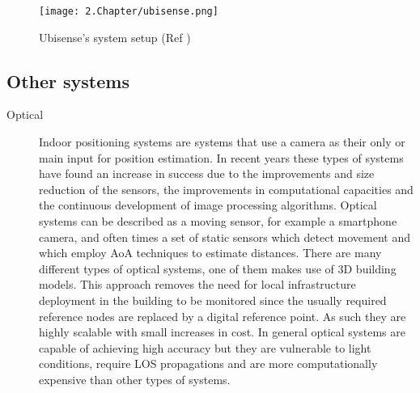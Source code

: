   
\begin{figure}[H]  
\centering  
\texttt{[image: 2.Chapter/ubisense.png]}  
\caption[Ubisense's system setup (Ref \cite{ubisense}) ]{Ubisense's system setup (Ref \cite{ubisense})}  
\label{fig:ubisense}  
\end{figure}  
  
  
  
  
\subsection{Other systems}  
\label{subsec:others}  
  
  
\begin{description}  
  
  
\item [Optical]  Indoor positioning systems are systems that use a camera as their only or main input for position estimation. In recent years these types of systems have found an increase in success due to the improvements and size reduction of the sensors, the improvements in computational capacities and the continuous development of image processing algorithms. Optical systems can be described as a moving sensor, for example a smartphone camera, and often times a set of static sensors which detect movement and which employ \ac{AoA} techniques to estimate distances. There are many different types of optical systems, one of them makes use of 3D building models. This approach removes the need for local infrastructure deployment in the building to be monitored since the usually required reference nodes are replaced by a digital reference point. As such they are highly scalable with small increases in cost.  
In general optical systems are capable of achieving high accuracy but they are vulnerable to light conditions, require \ac{LOS} propagations and are more computationally expensive than other types of systems.  
  
  
  

\end{description}

